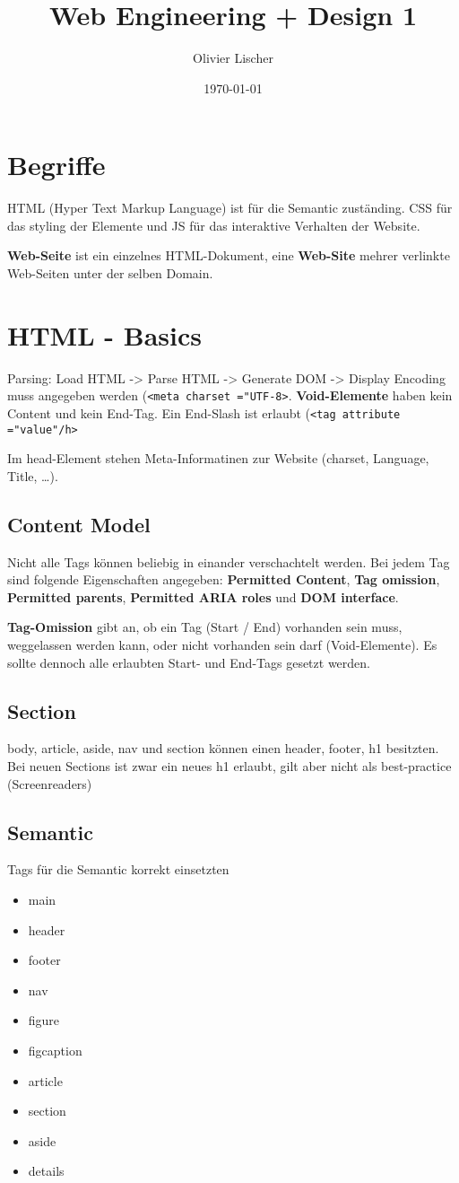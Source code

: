 \documentclass[11pt,twoside,landscape]{article}
\author{Olivier Lischer}
\date{\today}
\title{Web Engineering + Design 1}
\begin{document}
\begin{multicols}{4}
\section{Begriffe}
\label{sec:org1e83195}
HTML (Hyper Text Markup Language) ist für die Semantic zuständing. CSS für das styling der Elemente und JS für das interaktive Verhalten der Website.

\textbf{Web-Seite} ist ein einzelnes HTML-Dokument, eine \textbf{Web-Site} mehrer verlinkte Web-Seiten unter der selben Domain.

\section{HTML - Basics}
\label{sec:org768403d}
Parsing: Load HTML -> Parse HTML -> Generate DOM -> Display
Encoding muss angegeben werden (\texttt{<meta charset ="UTF-8>}. \textbf{Void-Elemente} haben kein Content und kein End-Tag. Ein End-Slash ist erlaubt (\texttt{<tag attribute ="value"/h>}

Im head-Element stehen Meta-Informatinen zur Website (charset, Language, Title, \ldots{}).

\subsection{Content Model}
\label{sec:org8cea30f}
Nicht alle Tags können beliebig in einander verschachtelt werden. Bei jedem Tag sind folgende Eigenschaften angegeben: \textbf{Permitted Content}, \textbf{Tag omission}, \textbf{Permitted parents}, \textbf{Permitted ARIA roles} und \textbf{DOM interface}.

\textbf{Tag-Omission} gibt an, ob ein Tag (Start / End) vorhanden sein muss, weggelassen werden kann, oder nicht vorhanden sein darf (Void-Elemente). Es sollte dennoch alle erlaubten Start- und End-Tags gesetzt werden.

\subsection{Section}
\label{sec:orgf3cc3cb}
body, article, aside, nav und section können einen header, footer, h1 besitzten. Bei neuen Sections ist zwar ein neues h1 erlaubt, gilt aber nicht als best-practice (Screenreaders)

\subsection{Semantic}
\label{sec:org3dce2bf}
Tags für die Semantic korrekt einsetzten
\begin{itemize}
\item main
\item header
\item footer
\item nav
\item figure
\item figcaption
\item article
\item section
\item aside
\item details
\end{itemize}


\end{multicols}
\end{document}
